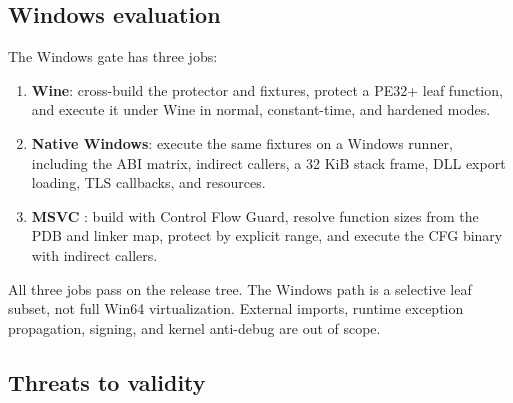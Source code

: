 \subsection{Windows evaluation}

The Windows gate has three jobs:

\begin{enumerate}
  \item \textbf{Wine}: cross-build the protector and fixtures, protect a PE32+
        leaf function, and execute it under Wine in normal, constant-time, and
        hardened modes.
  \item \textbf{Native Windows}: execute the same fixtures on a Windows runner,
        including the ABI matrix, indirect callers, a 32 KiB stack frame, DLL
        export loading, TLS callbacks, and  resources.
  \item \textbf{MSVC }: build with Control Flow Guard, resolve
        function sizes from the PDB and linker map, protect by explicit range,
        and execute the CFG binary with indirect callers.
\end{enumerate}

All three jobs pass on the release tree. The Windows path is a selective leaf
subset, not full Win64 virtualization. External imports, runtime exception
propagation, signing, and kernel anti-debug are out of scope.

\subsection{Threats to validity}

